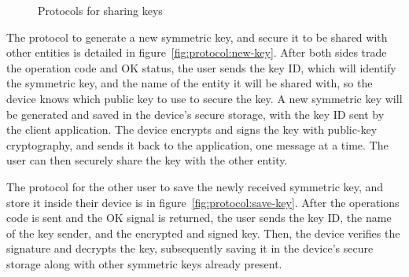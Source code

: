 \begin{figure}
	\centering     %
	\caption{Protocols for sharing keys}
\end{figure}

The protocol to generate a new symmetric key, and secure it to be shared with other entities is detailed in figure~\ref{fig:protocol:new-key}.
After both sides trade the operation code and OK status, the user sends the key ID, which will identify the symmetric key, and the name of the entity it will be shared with, so the device knows which public key to use to secure the key.
A new symmetric key will be generated and saved in the device's secure storage, with the key ID sent by the client application. The device encrypts and signs the key with public-key cryptography, and sends it back to the application, one message at a time. The user can then securely share the key with the other entity.

The protocol for the other user to save the newly received symmetric key, and store it inside their device is in figure~\ref{fig:protocol:save-key}.
After the operations code is sent and the OK signal is returned, the user sends the key ID, the name of the key sender, and the encrypted and signed key.
Then, the device verifies the signature and decrypts the key, subsequently saving it in the device's secure storage along with other symmetric keys already present.
